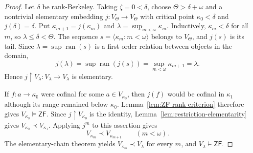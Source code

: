 \documentclass[11pt,a4paper]{amsart}
\newcommand{\ZF}{\mathsf{ZF}}
\newcommand{\restr}{\mathbin{\upharpoonright}}
\theoremstyle{plain}
\theoremstyle{definition}
\theoremstyle{remark}
\begin{document}
\begin{proof}
 Let $\delta$ be rank-Berkeley.  Taking $\zeta=0<\delta$, choose $\Theta>\delta+\omega$ and a nontrivial elementary embedding $j:V_\Theta\longrightarrow V_\Theta$ with critical point $\kappa_0<\delta$ and $j(\delta)=\delta$.  Put $\kappa_{m+1}=j(\kappa_m)$ and $\lambda=\sup_{m<\omega}\kappa_m$.  Inductively, $\kappa_m<\delta$ for all $m$, so $\lambda\leq\delta<\Theta$.  The sequence $s=\langle\kappa_m:m<\omega\rangle$ belongs to $V_\Theta$, and $j(s)$ is its tail.  Since $\lambda=\sup\operatorname{ran}(s)$ is a first-order relation between objects in the domain,
\[
j(\lambda)=\sup\operatorname{ran}(j(s))=\sup_{m<\omega}\kappa_{m+1}=\lambda.
\]
Hence $j\restr V_\lambda:V_\lambda\to V_\lambda$ is elementary.

If $f:a\to\kappa_0$ were cofinal for some $a\in V_{\kappa_0}$, then $j(f)$ would be cofinal in $\kappa_1$ although its range remained below $\kappa_0$.  Lemma~\ref{lem:ZF-rank-criterion} therefore gives $V_{\kappa_0}\models\ZF$.  Since $j\restr V_{\kappa_0}$ is the identity, Lemma~\ref{lem:restriction-elementarity} gives $V_{\kappa_0}\prec V_{\kappa_1}$.  Applying $j^m$ to this assertion gives
\[
V_{\kappa_m}\prec V_{\kappa_{m+1}}\qquad(m<\omega).
\]
The elementary-chain theorem yields $V_{\kappa_m}\prec V_\lambda$ for every $m$, and $V_\lambda\models\ZF$.


\end{proof}
\end{document}
